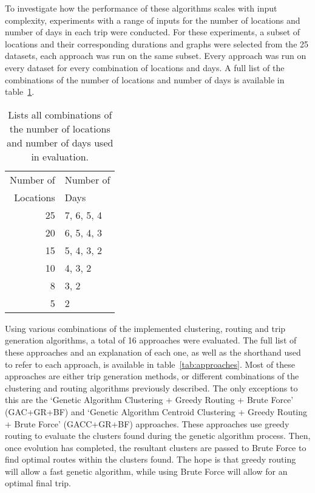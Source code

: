 \noindent
To investigate how the performance of these algorithms scales with input complexity, experiments with a range of
inputs for the number of locations and number of days in each trip were conducted.
For these experiments, a subset of locations and their corresponding durations and graphs were selected from the 25
datasets, each approach was run on the same subset.
Every approach was run on every dataset for every combination of locations and days.
A full list of the combinations of the number of locations and number of days is available in table~\ref{tab:locations-and-days}.
\begin{table}[H]
    \centering
    \caption{Lists all combinations of the number of locations and number of days used in evaluation.}\label{tab:locations-and-days}
    \begin{tabular}{ r | l }
        Number of & Number of \\
        Locations & Days \\
        25 & 7, 6, 5, 4 \\
        20 & 6, 5, 4, 3 \\
        15 & 5, 4, 3, 2 \\
        10 & 4, 3, 2 \\
        8  & 3, 2 \\
        5  & 2 \\
    \end{tabular}
\end{table}

\noindent
Using various combinations of the implemented clustering, routing and trip generation algorithms, a total of 16
approaches were evaluated.
The full list of these approaches and an explanation of each one, as well as the shorthand used to refer to each
approach, is available in table~\ref{tab:approaches}.
Most of these approaches are either trip generation methods, or different combinations of the clustering and routing
algorithms previously described.
The only exceptions to this are the `Genetic Algorithm Clustering + Greedy Routing + Brute Force' (GAC+GR+BF) and
`Genetic Algorithm Centroid Clustering + Greedy Routing + Brute Force' (GACC+GR+BF) approaches.
These approaches use greedy routing to evaluate the clusters found during the genetic algorithm process.
Then, once evolution has completed, the resultant clusters are passed to Brute Force to find optimal routes within
the clusters found.
The hope is that greedy routing will allow a fast genetic algorithm, while using Brute Force will allow for an
optimal final trip.

